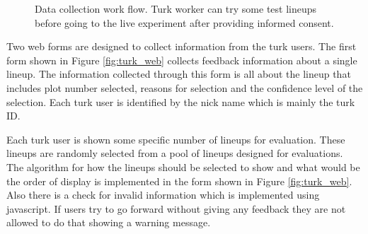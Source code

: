 \documentclass[11pt]{article}
\begin{document}
\begin{figure}[hbtp]
   \centering
       \caption{Data collection work flow. Turk worker can try some test lineups before going to the live experiment after providing informed consent.}
       \label{fig:turk_data_flow}
\end{figure}

Two web forms are designed to collect information from the turk users. The first form shown in Figure \ref{fig:turk_web} collects feedback information about a single lineup. The information collected through this form is all about the lineup that includes plot number selected, reasons for selection and the confidence level of the selection. Each turk user is identified by the nick name which is mainly the turk ID. 

Each turk user is shown some specific number of lineups for evaluation. These lineups are randomly selected from a pool of lineups designed for evaluations. The algorithm for how the lineups should be selected to show and what would be the order of display is implemented in the form shown in Figure \ref{fig:turk_web}. Also there is a check for invalid information which is implemented using javascript. If users try to go forward without giving any feedback they are not allowed to do that showing a warning message.
\end{document}

